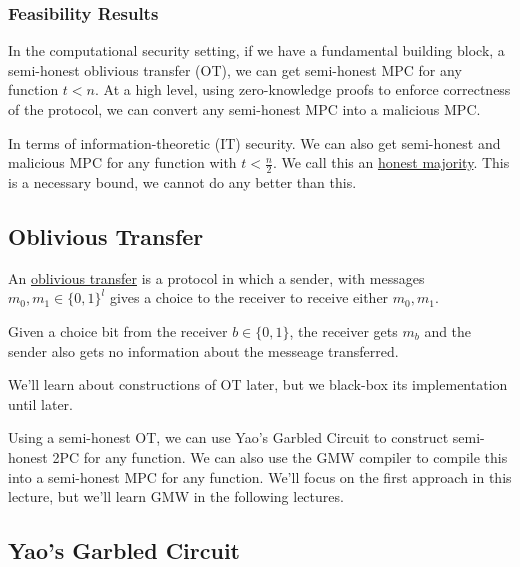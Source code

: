\subsubsection{Feasibility Results}
In the computational security setting, if we have a fundamental building block, a semi-honest oblivious transfer (OT), we can get semi-honest MPC for any function $t<n$. At a high level, using zero-knowledge proofs to enforce correctness of the protocol, we can convert any semi-honest MPC into a malicious MPC.

In terms of information-theoretic (IT) security. We can also get semi-honest and malicious MPC for any function with $t < \frac{n}{2}$. We call this an \ul{honest majority}. This is a necessary bound, we cannot do any better than this.

\subsection{Oblivious Transfer}
\begin{definition}
    An \ul{oblivious transfer} is a protocol in which a sender, with messages $m_0, m_1\in\{0, 1\}^l$ gives a choice to the receiver to receive either $m_0, m_1$.

    Given a choice bit from the receiver $b\in\{0,1\}$, the receiver gets $m_b$ and the sender also gets no information about the messeage transferred.

\end{definition}

We'll learn about constructions of OT later, but we black-box its implementation until later.

Using a semi-honest OT, we can use Yao's Garbled Circuit to construct semi-honest 2PC for any function. We can also use the GMW compiler to compile this into a semi-honest MPC for any function. We'll focus on the first approach in this lecture, but we'll learn GMW in the following lectures.

\subsection{Yao's Garbled Circuit}


